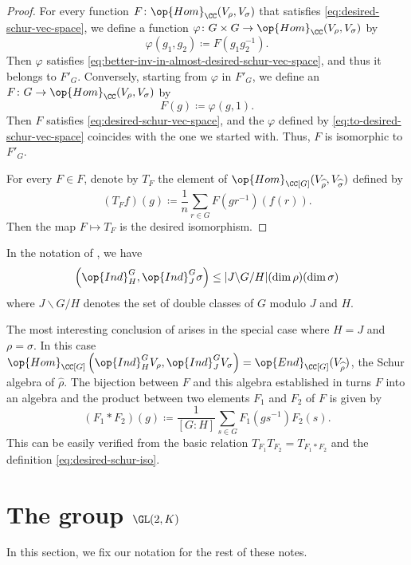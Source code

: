 \documentclass[../main.tex]{subfiles}
\begin{document}
\begin{proof}
	For every function $F\colon\op{Hom}_\CC(V_\rho,V_\sigma)$ that satisfies \eqref{eq:desired-schur-vec-space}, we define a function $\varphi\colon G\times G\to\op{Hom}_\CC(V_\rho,V_\sigma)$ by
	\begin{equation}
		\varphi(g_1,g_2)\coloneqq F\left(g_1g_2^{-1}\right). \label{eq:to-desired-schur-vec-space}
	\end{equation}
	Then $\varphi$ satisfies \eqref{eq:better-inv-in-almost-desired-schur-vec-space}, and thus it belongs to $F'_G$. Conversely, starting from $\varphi$ in $F'_G$, we define an $F\colon G\to\op{Hom}_\CC(V_\rho,V_\sigma)$ by
	\[F(g)\coloneqq\varphi(g,1).\]
	Then $F$ satisfies \eqref{eq:desired-schur-vec-space}, and the $\varphi$ defined by \eqref{eq:to-desired-schur-vec-space} coincides with the one we started with. Thus, $F$ is isomorphic to $F'_G$.

	For every $F\in F$, denote by $T_F$ the element of $\op{Hom}_{\CC[G]}(V_{\widehat\rho},V_{\widehat\sigma})$ defined by
	\begin{equation}
		(T_Ff)(g)\coloneqq\frac1n\sum_{r\in G}F\left(gr^{-1}\right)(f(r)). \label{eq:desired-schur-iso}
	\end{equation}
	Then the map $F\mapsto T_F$ is the desired isomorphism.
\end{proof}
\begin{corollary}
	In the notation of , we have
	\[\left(\op{Ind}^G_H,\op{Ind}^G_J\sigma\right)\le|J\backslash G/H|(\dim\rho)(\dim\sigma)\]
	where $J\backslash G/H$ denotes the set of double classes of $G$ modulo $J$ and $H$.
\end{corollary}

The most interesting conclusion of  arises in the special case where $H=J$ and $\rho=\sigma$. In this case $\op{Hom}_{\CC[G]}\left(\op{Ind}^G_HV_\rho,\op{Ind}^G_JV_\sigma\right)=\op{End}_{\CC[G]}(V_{\widehat\rho})$, the Schur algebra of $\widehat\rho$. The bijection between $F$ and this algebra established in  turns $F$ into an algebra and the product between two elements $F_1$ and $F_2$ of $F$ is given by
\begin{equation}
	(F_1*F_2)(g)\coloneqq\frac1{[G:H]}\sum_{s\in G}F_1\left(gs^{-1}\right)F_2(s). \label{eq:better-schur-ind-mult}
\end{equation}
This can be easily verified from the basic relation $T_{F_1}T_{F_2}=T_{F_1*F_2}$ and the definition \eqref{eq:desired-schur-iso}.

\section{The group \texorpdfstring{$\GL(2,K)$}{ GL(2,K)}}
In this section, we fix our notation for the rest of these notes.
\end{document}
